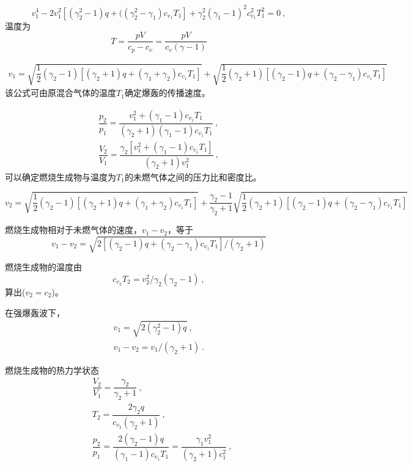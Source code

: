 \documentclass[12pt,a4paper]{article}
\begin{document}
\begin{equation*}
v_1^4 -2v_1^2 [(\gamma_2^2 -1)q +((\gamma_2^2 -\gamma_1)c_{v_1}T_1] +\gamma_2^2 (\gamma_1 -1)^2 c_{v_1}^2 T_1^2 = 0 ~,
\end{equation*}
温度为
\begin{equation*}
T= \dfrac{pV}{c_p -c_v}  = \dfrac{pV}{c_v(\gamma-1)}
\end{equation*}

\begin{align}
v_1 = \sqrt{\dfrac{1}{2}(\gamma_2 -1)[(\gamma_2 +1)q +(\gamma_1 +\gamma_2)c_{v_1}T_1] } +\sqrt{\dfrac{1}{2}(\gamma_2 +1)[(\gamma_2 -1)q +(\gamma_2 -\gamma_1)c_{v_1}T_1] }
\end{align}
该公式可由原混合气体的温度$T_1$确定爆轰的传播速度。

\begin{align}
\dfrac{p_2}{p_1} = \dfrac{v_1^2 +(\gamma_1 -1)c_{v_1}T_1}{(\gamma_2 +1)(\gamma_1 -1)c_{v_1}T_1} ~, \\
\dfrac{V_2}{V_1} = \dfrac{\gamma_2[v_1^2 +(\gamma_1 -1)c_{v_1}T_1]}{(\gamma_2 +1)v_1^2} ~, 
\end{align}
可以确定燃烧生成物与温度为$T_1$的未燃气体之间的压力比和密度比。

\begin{equation}
v_2 = \sqrt{\dfrac{1}{2}(\gamma_2 -1)[(\gamma_2 +1)q +(\gamma_1 +\gamma_2)c_{v_1}T_1] } +\dfrac{\gamma_2 -1}{\gamma_2 +1}\sqrt{\dfrac{1}{2}(\gamma_2 +1)[(\gamma_2 -1)q +(\gamma_2 -\gamma_1)c_{v_1}T_1] }
\end{equation}

燃烧生成物相对于未燃气体的速度，$v_1 -v_2$，等于
\begin{equation}
v_1 - v_2  = \sqrt{2[(\gamma_2 -1)q +(\gamma_2 -\gamma_1)c_{v_1}T_1] /(\gamma_2 +1)}
\end{equation}

燃烧生成物的温度由
\begin{equation}
c_{v_2} T_2 = v_2^2 /\gamma_2(\gamma_2-1) ~,
\end{equation}
算出($v_2 = c_2$)。

在强爆轰波下，
\begin{align}
v_1 = \sqrt{2(\gamma_2^2-1)q} ~, \\
v_1 -v_2 = v_1 /(\gamma_2 +1) ~.
\end{align}

燃烧生成物的热力学状态
\begin{align}
& \dfrac{V_2}{V_1} = \dfrac{\gamma_2}{\gamma_2 +1} ~, \\
& T_2 = \dfrac{2\gamma_2 q}{c_{v_2}(\gamma_2 +1)} ~, \\
& \dfrac{p_2}{p_1} = \dfrac{2(\gamma_2 -1)q}{(\gamma_1 -1)c_{v_1}T_1} = \dfrac{\gamma_1 v_1^2}{(\gamma_2 +1)c_{1}^2} ~, 
\end{align}
\end{document}
